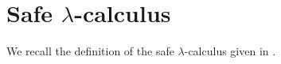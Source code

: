 \chapter{Safe $\lambda$-calculus}

We recall the definition of the safe $\lambda$-calculus given in
\cite{Ong2005}.




